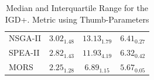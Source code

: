 \begin{table}[!htp]
{\begin{tabular}{@{}lccccccccc@{}}
NSGA-II  & \multicolumn{3}{c}{$3.02_{1.48}$}                   & \multicolumn{3}{c}{$13.13_{1.79}$}                   & \multicolumn{3}{c}{$6.41_{0.27}$}                   \\
SPEA-II  & \multicolumn{3}{c}{$2.82_{1.43}$}                   & \multicolumn{3}{c}{$11.93_{4.19}$}                   & \multicolumn{3}{c}{$6.32_{0.42}$}                   \\
MORS     & \multicolumn{3}{c}{\cellcolor{gray95}$2.25_{1.28}$} & \multicolumn{3}{c}{\cellcolor{gray25}$6.89_{1.15}$}  & \multicolumn{3}{c}{\cellcolor{gray95}$5.67_{0.05}$} \\ \bottomrule
\end{tabular}%
}
\caption{Median and Interquartile Range for the IGD+. Metric using Thumb-Parameters}
\label{tab:igd+_thumb}
\end{table}

